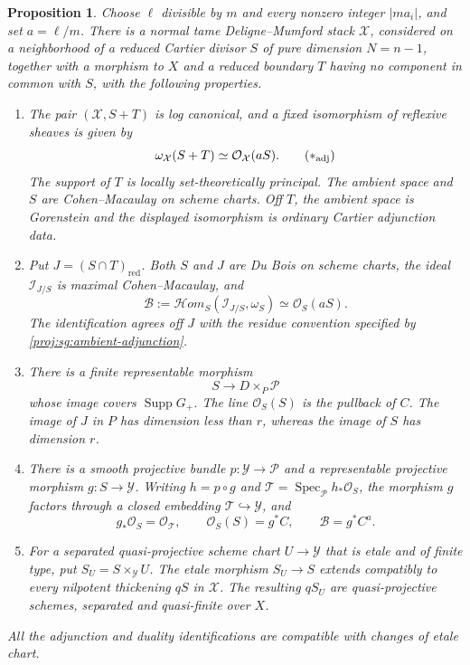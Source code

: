 \documentclass[11pt,letterpaper]{article}
\newtheorem{proposition}[theorem]{Proposition}
\theoremstyle{definition}
\theoremstyle{remark}
\begin{document}
\begin{proposition}\label{proj:prop:signed-construction}
Choose $\ell$ divisible by $m$ and every nonzero integer $|ma_i|$,
and set $a=\ell/m$.  There is a normal tame Deligne--Mumford stack
$\mathcal X$, considered on a neighborhood of a reduced Cartier
divisor $S$ of pure dimension $N=n-1$, together with a morphism
to $X$ and a reduced boundary
$T$ having no component in common with $S$, with the following
properties.
\begin{enumerate}[label=\textup{(\roman*)}]
\item
The pair $(\mathcal X,S+T)$ is log canonical, and a fixed
isomorphism of reflexive sheaves is given by
\[
 \omega_{\mathcal X}(S+T)\simeq\mathcal{O}_{\mathcal X}(aS).
 \tag{\(\ast_{\mathrm{adj}}\)}\label{proj:sg:ambient-adjunction}
\]
The support of $T$ is locally set-theoretically principal.
The ambient space and $S$ are Cohen--Macaulay on scheme charts.
Off $T$, the ambient space is Gorenstein and the displayed
isomorphism is ordinary Cartier adjunction data.

\item
Put $J=(S\cap T)_{\mathrm{red}}$.  Both $S$ and $J$ are Du Bois
on scheme charts, the ideal $\mathcal I_{J/S}$ is maximal
Cohen--Macaulay, and
\[
 \mathcal B:=
 \mathcal Hom_S(\mathcal I_{J/S},\omega_S)
 \simeq\mathcal{O}_S(aS).
\]
The identification agrees off $J$ with the residue convention
specified by \eqref{proj:sg:ambient-adjunction}.

\item
There is a finite representable morphism
\[
 S\longrightarrow D\times_P\mathcal P
\]
whose image covers $\operatorname{Supp} G_+$.  The line $\mathcal{O}_S(S)$ is the pullback
of $C$.  The image of $J$ in $P$ has dimension less than $r$,
whereas the image of $S$ has dimension $r$.

\item
There is a smooth projective bundle $p:\mathcal Y\to\mathcal P$
and a representable projective morphism $g:S\to\mathcal Y$.
Writing $h=p\circ g$ and
$\mathcal T=\operatorname{Spec}_{\mathcal P}h_*\mathcal{O}_S$, the morphism $g$ factors
through a closed embedding $\mathcal T\hookrightarrow\mathcal Y$,
and
\[
 g_*\mathcal{O}_S=\mathcal{O}_{\mathcal T},\qquad
 \mathcal{O}_S(S)=g^*C,\qquad \mathcal B=g^*C^a.
\]

\item
For a separated quasi-projective scheme chart
$U\to\mathcal Y$ that is etale and of finite type, put
$S_U=S\times_{\mathcal Y}U$.
The etale morphism $S_U\to S$ extends compatibly to every
nilpotent thickening $qS$ in $\mathcal X$.
The resulting $qS_U$ are quasi-projective schemes, separated
and quasi-finite over $X$.
\end{enumerate}
All the adjunction and duality identifications are compatible
with changes of etale chart.
\end{proposition}
\end{document}
